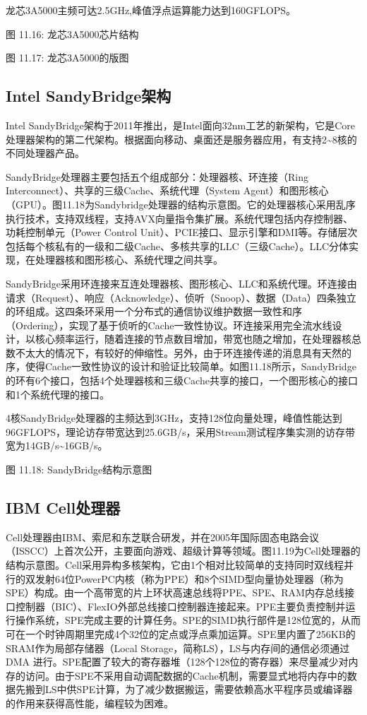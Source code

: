 \documentclass[]{ctexbook}
\begin{document}
龙芯3A5000主频可达2.5GHz,峰值浮点运算能力达到160GFLOPS。

图 11.16: 龙芯3A5000芯片结构

图 11.17: 龙芯3A5000的版图

\hypertarget{intel-sandybridgeux67b6ux6784}{%
\subsection{Intel SandyBridge架构}\label{intel-sandybridgeux67b6ux6784}}

Intel SandyBridge架构于2011年推出，是Intel面向32nm工艺的新架构，它是Core处理器架构的第二代架构。根据面向移动、桌面还是服务器应用，有支持2\textasciitilde8核的不同处理器产品。

SandyBridge处理器主要包括五个组成部分：处理器核、环连接（Ring Interconnect）、共享的三级Cache、系统代理（System Agent）和图形核心（GPU）。图11.18为Sandybridge处理器的结构示意图。它的处理器核心采用乱序执行技术，支持双线程，支持AVX向量指令集扩展。系统代理包括内存控制器、功耗控制单元（Power Control Unit）、PCIE接口、显示引擎和DMI等。存储层次包括每个核私有的一级和二级Cache、多核共享的LLC（三级Cache）。LLC分体实现，在处理器核和图形核心、系统代理之间共享。

SandyBridge采用环连接来互连处理器核、图形核心、LLC和系统代理。环连接由请求（Request）、响应（Acknowledge）、侦听（Snoop）、数据（Data）四条独立的环组成。这四条环采用一个分布式的通信协议维护数据一致性和序（Ordering），实现了基于侦听的Cache一致性协议。环连接采用完全流水线设计，以核心频率运行，随着连接的节点数目增加，带宽也随之增加，在处理器核总数不太大的情况下，有较好的伸缩性。另外，由于环连接传递的消息具有天然的序，使得Cache一致性协议的设计和验证比较简单。如图11.18所示，SandyBridge的环有6个接口，包括4个处理器核和三级Cache共享的接口，一个图形核心的接口和1个系统代理的接口。

4核SandyBridge处理器的主频达到3GHz，支持128位向量处理，峰值性能达到96GFLOPS，理论访存带宽达到25.6GB/s，采用Stream测试程序集实测的访存带宽为14GB/s\textasciitilde16GB/s。

图 11.18: SandyBridge结构示意图

\hypertarget{ibm-cellux5904ux7406ux5668}{%
\subsection{IBM Cell处理器}\label{ibm-cellux5904ux7406ux5668}}

Cell处理器由IBM、索尼和东芝联合研发，并在2005年国际固态电路会议（ISSCC）上首次公开，主要面向游戏、超级计算等领域。图11.19为Cell处理器的结构示意图。Cell采用异构多核架构，它由1个相对比较简单的支持同时双线程并行的双发射64位PowerPC内核（称为PPE）和8个SIMD型向量协处理器（称为SPE）构成。由一个高带宽的片上环状高速总线将PPE、SPE、RAM内存总线接口控制器（BIC）、FlexIO外部总线接口控制器连接起来。PPE主要负责控制并运行操作系统，SPE完成主要的计算任务。SPE的SIMD执行部件是128位宽的，从而可在一个时钟周期里完成4个32位的定点或浮点乘加运算。SPE里内置了256KB的SRAM作为局部存储器（Local Storage，简称LS），LS与内存间的通信必须通过DMA 进行。SPE配置了较大的寄存器堆（128个128位的寄存器）来尽量减少对内存的访问。由于SPE不采用自动调配数据的Cache机制，需要显式地将内存中的数据先搬到LS中供SPE计算，为了减少数据搬运，需要依赖高水平程序员或编译器的作用来获得高性能，编程较为困难。
\end{document}

